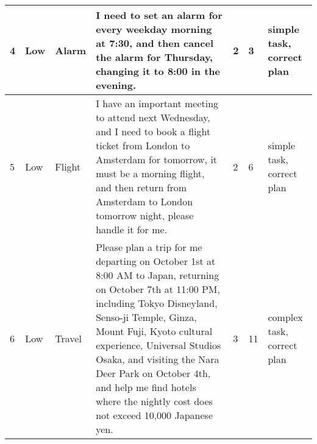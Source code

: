 \begin{table*}[htbp]
{\begin{tabular}{p{}|p{}|p{}|p{}|p{}|p{}| p{}}
        \hline
        4& Low& Alarm& I need to set an alarm for every weekday morning at 7:30, and then cancel the alarm for Thursday, changing it to 8:00 in the evening.&2&3& simple task, correct plan\\
        \hline
        5& Low& Flight& I have an important meeting to attend next Wednesday, and I need to book a flight ticket from London to Amsterdam for tomorrow, it must be a morning flight, and then return from Amsterdam to London tomorrow night, please handle it for me.&2&6& simple task, correct plan\\
        \hline
        6& Low& Travel& Please plan a trip for me departing on October 1st at 8:00 AM to Japan, returning on October 7th at 11:00 PM, including Tokyo Disneyland, Senso-ji Temple, Ginza, Mount Fuji, Kyoto cultural experience, Universal Studios Osaka, and visiting the Nara Deer Park on October 4th, and help me find hotels where the nightly cost does not exceed 10,000 Japanese yen.&3&11& complex task, correct plan\\
        \hline
            \hline
    \end{tabular}}
\end{table*}%

